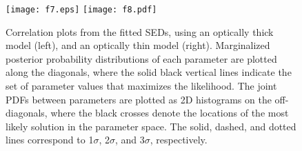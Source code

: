\documentclass[iop, revtex4]{emulateapj}
\begin{document}
\begin{figure}[!tbph]
\centering
\hspace{-1.1cm}
\texttt{[image: f7.eps]}
\hspace{-1cm}
\texttt{[image: f8.pdf]}
\hspace{-1.1cm}
\caption{Correlation plots from the fitted SEDs, using an optically thick
model (left), and an optically thin model (right). Marginalized posterior probability
distributions of each
parameter are plotted along the diagonals, where the solid black vertical lines indicate the set of parameter values that maximizes the likelihood. The joint PDFs between parameters are plotted as 2D histograms on the off-diagonals, where the black crosses denote the
locations of the most likely solution in the parameter space. The solid, dashed, and dotted lines correspond to 1$\sigma$, 2$\sigma$, and $3\sigma$, respectively. 
\label{fig:sedlikelihood}}
\end{figure}
\end{document}
